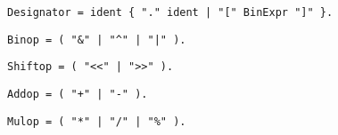 
\begin{samepage}
\begin{lstlisting}[language=EBNF]
Designator = ident { "." ident | "[" BinExpr "]" }.
\end{lstlisting}
\end{samepage}


\begin{samepage}
\begin{lstlisting}[language=EBNF]
Binop = ( "&" | "^" | "|" ).
\end{lstlisting}
\end{samepage}


\begin{samepage}
\begin{lstlisting}[language=EBNF]
Shiftop = ( "<<" | ">>" ).
\end{lstlisting}
\end{samepage}


\begin{samepage}
\begin{lstlisting}[language=EBNF]
Addop = ( "+" | "-" ).
\end{lstlisting}
\end{samepage}


\begin{samepage}
\begin{lstlisting}[language=EBNF]
Mulop = ( "*" | "/" | "%" ).
\end{lstlisting}
\end{samepage}
